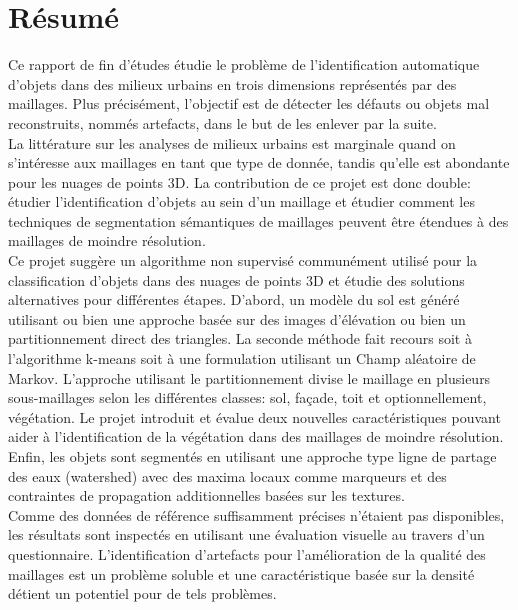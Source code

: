 \documentclass{kththesis}
\begin{document}
\section{Résumé}
Ce rapport de fin d'études étudie le problème de l'identification automatique d'objets dans des milieux urbains en trois dimensions représentés par des maillages. Plus précisément, l'objectif est de détecter les défauts ou objets mal reconstruits, nommés artefacts, dans le but de les enlever par la suite. \\
La littérature sur les analyses de milieux urbains est marginale quand on s'intéresse aux maillages en tant que type de donnée, tandis qu'elle est abondante pour les nuages de points 3D. La contribution de ce projet est donc double: étudier l'identification d'objets au sein d'un maillage et étudier comment les techniques de segmentation sémantiques de maillages peuvent être étendues à des maillages de moindre résolution. \\
Ce projet suggère un algorithme non supervisé communément utilisé pour la classification d'objets dans des nuages de points 3D et étudie des solutions alternatives pour différentes étapes. D'abord, un modèle du sol est généré utilisant ou bien une approche basée sur des images d'élévation ou bien un partitionnement direct des triangles. La seconde méthode fait recours soit à l'algorithme k-means soit à une formulation utilisant un Champ aléatoire de Markov. L'approche utilisant le partitionnement divise le maillage en plusieurs sous-maillages selon les différentes classes: sol, façade, toit et optionnellement, végétation.  Le projet introduit et évalue deux nouvelles caractéristiques pouvant aider à l'identification de la végétation dans des maillages de moindre résolution. Enfin, les objets sont segmentés en utilisant une approche type ligne de partage des eaux (watershed) avec des maxima locaux comme marqueurs et des contraintes de propagation additionnelles basées sur les textures. \\
Comme des données de référence suffisamment précises n'étaient pas disponibles, les résultats sont inspectés en utilisant une évaluation visuelle au travers d'un questionnaire. L'identification d'artefacts pour l'amélioration de la qualité des maillages est un problème soluble et une caractéristique basée sur la densité détient un potentiel pour de tels problèmes. 
\end{document}
